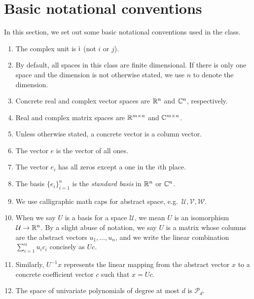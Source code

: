 \section{Basic notational conventions}

In this section, we set out some basic notational conventions used
in the class.
\begin{enumerate}
\item
  The complex unit is $\mathrm{i}$ (not $i$ or $j$).

\item
  By default, all spaces in this class are finite dimensional. If there
  is only one space and the dimension is not otherwise stated, we use
  $n$ to denote the dimension.

\item
  Concrete real and complex vector spaces are $\mathbb{R}^n$ and $\mathbb{C}^n$,
  respectively.

\item
  Real and complex matrix spaces are $\mathbb{R}^{m\times n}$ and $\mathbb{C}^{m
  \times n}$.

\item Unless otherwise stated, a concrete vector is a column vector.

\item The vector $e$ is the vector of all ones.

\item The vector $e_i$ has all zeros except a one in the $i$th place.

\item
  The basis $\{ e_i \}_{i=1}^n$ is the {\em standard basis} in $\mathbb{R}^n$
  or $\mathbb{C}^n$.

\item
  We use calligraphic math caps for abstract space,
  e.g.~$\mathcal{U}, \mathcal{V}, \mathcal{W}$.

\item
   When we say $U$ is a basis for a space $\mathcal{U}$, we mean $U$ is
   an isomorphism $\mathcal{U} \rightarrow \mathbb{R}^n$.  By a slight abuse
   of notation, we say $U$ is a matrix whose columns are the abstract
   vectors $u_1, \ldots, u_n$, and we write the linear combination
   $\sum_{i=1}^n u_i c_i$ concisely as $Uc$.

\item
  Similarly, $U^{-1} x$ represents the linear mapping from the
  abstract vector $x$ to a concrete coefficient vector $c$ such
  that $x = Uc$.

\item The space of univariate polynomials of degree at most
  $d$ is $\mathcal{P}_d$.


\end{enumerate}
